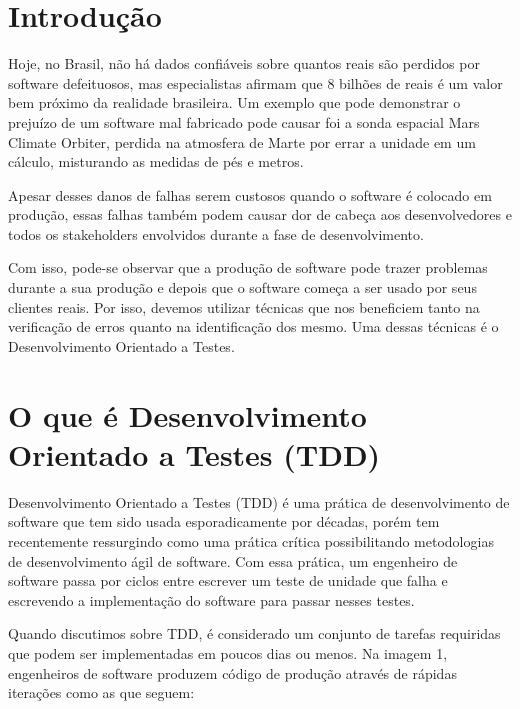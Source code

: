 \documentclass[12pt]{article}
\begin{document}
  \clearpage
  \renewcommand*\contentsname{Sumário}
  

  \tableofcontents

  \clearpage

  \section{Introdução}

  Hoje, no Brasil, não há dados confiáveis sobre quantos reais são perdidos por
  software defeituosos, mas especialistas afirmam que 8 bilhões de reais é um
  valor bem próximo da realidade brasileira. Um exemplo que pode demonstrar o 
  prejuízo de um software mal fabricado pode causar foi a sonda espacial Mars 
  Climate Orbiter, perdida na atmosfera de Marte por errar a unidade em um
  cálculo, misturando as medidas de pés e metros.

  Apesar desses danos de falhas serem custosos quando o software é colocado em
  produção, essas falhas também podem causar dor de cabeça aos desenvolvedores e
  todos os stakeholders envolvidos durante a fase de desenvolvimento.

  Com isso, pode-se observar que a produção de software pode trazer problemas
  durante a sua produção e depois que o software começa a ser usado por seus
  clientes reais. Por isso, devemos utilizar técnicas que nos beneficiem tanto
  na verificação de erros quanto na identificação dos mesmo. Uma dessas técnicas
  é o Desenvolvimento Orientado a Testes.

  \section{O que é Desenvolvimento Orientado a Testes (TDD)}

  Desenvolvimento Orientado a Testes (TDD)
   é uma prática de desenvolvimento de software que tem 
  sido usada esporadicamente por décadas, porém tem recentemente ressurgindo 
  como uma prática crítica 
  possibilitando metodologias de desenvolvimento ágil de software. Com essa 
  prática, um engenheiro de 
  software passa por ciclos entre escrever um teste de unidade que falha e 
  escrevendo a implementação do software para passar nesses testes. 

  Quando discutimos sobre TDD, é considerado um conjunto de tarefas requiridas 
  que podem ser implementadas em poucos dias ou menos. Na imagem 1, engenheiros 
  de software produzem código de produção através de rápidas iterações como as 
  que seguem:
\end{document}
